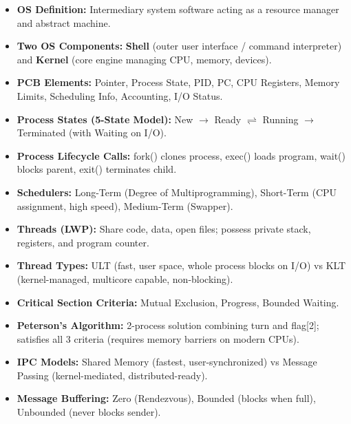 \documentclass[11pt,a4paper]{article}
\newcommand{\ic}[1]{\mbox{\colorbox{AnthCodeBG}{\footnotesize\ttfamily\textcolor{AnthBlue}{#1}}}}
\newenvironment{Note}[1][Note]{\begin{tcolorbox}[notebox, title={#1}]}{\end{tcolorbox}}
\begin{document}
\begin{Note}[Key Concepts Quick Summary]
\begin{itemize}
    \item \textbf{OS Definition:} Intermediary system software acting as a resource manager and abstract machine.
    \item \textbf{Two OS Components:} \textbf{Shell} (outer user interface / command interpreter) and \textbf{Kernel} (core engine managing CPU, memory, devices).
    \item \textbf{PCB Elements:} Pointer, Process State, PID, PC, CPU Registers, Memory Limits, Scheduling Info, Accounting, I/O Status.
    \item \textbf{Process States (5-State Model):} New $\to$ Ready $\rightleftharpoons$ Running $\to$ Terminated (with Waiting on I/O).
    \item \textbf{Process Lifecycle Calls:} \ic{fork()} clones process, \ic{exec()} loads program, \ic{wait()} blocks parent, \ic{exit()} terminates child.
    \item \textbf{Schedulers:} Long-Term (Degree of Multiprogramming), Short-Term (CPU assignment, high speed), Medium-Term (Swapper).
    \item \textbf{Threads (LWP):} Share code, data, open files; possess private stack, registers, and program counter.
    \item \textbf{Thread Types:} ULT (fast, user space, whole process blocks on I/O) vs KLT (kernel-managed, multicore capable, non-blocking).
    \item \textbf{Critical Section Criteria:} Mutual Exclusion, Progress, Bounded Waiting.
    \item \textbf{Peterson's Algorithm:} 2-process solution combining \ic{turn} and \ic{flag[2]}; satisfies all 3 criteria (requires memory barriers on modern CPUs).
    \item \textbf{IPC Models:} Shared Memory (fastest, user-synchronized) vs Message Passing (kernel-mediated, distributed-ready).
    \item \textbf{Message Buffering:} Zero (Rendezvous), Bounded (blocks when full), Unbounded (never blocks sender).
\end{itemize}
\end{Note}
\end{document}
